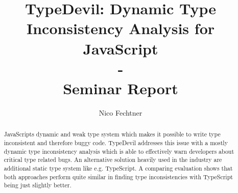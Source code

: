 \documentclass[runningheads,a4paper]{llncs}
\newcommand{\keywords}[1]{\par\addvspace\baselineskip

\noindent\keywordname\enspace\ignorespaces#1}
\begin{document}

\mainmatter  %

\title{TypeDevil: Dynamic Type Inconsistency Analysis for JavaScript\\-\\Seminar Report}


\author{Nico Fechtner}
%


%
%

\toctitle{}
\tocauthor{}
\maketitle

\setcounter{tocdepth}{2}
\tableofcontents
\newpage

\begin{abstract}
JavaScripts dynamic and weak type system which makes it possible to write type inconsistent and therefore buggy code. 
TypeDevil addresses this issue with a mostly dynamic type inconsistency analysis which is able to effectively warn developers about critical type related bugs.
An alternative solution heavily used in the industry are additional static type system like e.g. TypeScript.
A comparing evaluation shows that both approaches perform quite similar in finding type inconsistencies with TypeScript being just slightly better.
\end{abstract}
\end{document}
